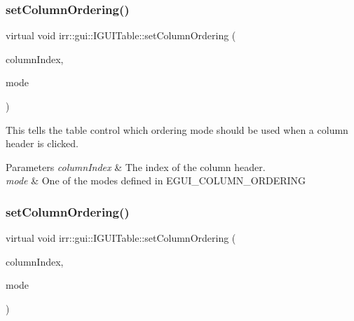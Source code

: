 \subsubsection{\texorpdfstring{set\+Column\+Ordering()}{setColumnOrdering()}\hspace{0.1cm}{\footnotesize\ttfamily [1/2]}}
{\footnotesize\ttfamily virtual void irr\+::gui\+::\+I\+G\+U\+I\+Table\+::set\+Column\+Ordering (\begin{DoxyParamCaption}\item[{\hyperlink{namespaceirr_a0416a53257075833e7002efd0a18e804}{u32}}]{column\+Index,  }\item[{\hyperlink{namespaceirr_1_1gui_a551e22458ae01a7eeaf87c0fbaaabf9a}{E\+G\+U\+I\+\_\+\+C\+O\+L\+U\+M\+N\+\_\+\+O\+R\+D\+E\+R\+I\+NG}}]{mode }\end{DoxyParamCaption})\hspace{0.3cm}{\ttfamily [pure virtual]}}



This tells the table control which ordering mode should be used when a column header is clicked. 


\begin{DoxyParams}{Parameters}
{\em column\+Index} & The index of the column header. \\
\hline
{\em mode} & One of the modes defined in E\+G\+U\+I\+\_\+\+C\+O\+L\+U\+M\+N\+\_\+\+O\+R\+D\+E\+R\+I\+NG \\
\hline
\end{DoxyParams}
\mbox{\label{classirr_1_1gui_1_1IGUITable_a7d0ce2de316fb7f0e6164e8c196a819e}} 
\subsubsection{\texorpdfstring{set\+Column\+Ordering()}{setColumnOrdering()}\hspace{0.1cm}{\footnotesize\ttfamily [2/2]}}
{\footnotesize\ttfamily virtual void irr\+::gui\+::\+I\+G\+U\+I\+Table\+::set\+Column\+Ordering (\begin{DoxyParamCaption}\item[{\hyperlink{namespaceirr_a0416a53257075833e7002efd0a18e804}{u32}}]{column\+Index,  }\item[{\hyperlink{namespaceirr_1_1gui_a551e22458ae01a7eeaf87c0fbaaabf9a}{E\+G\+U\+I\+\_\+\+C\+O\+L\+U\+M\+N\+\_\+\+O\+R\+D\+E\+R\+I\+NG}}]{mode }\end{DoxyParamCaption})\hspace{0.3cm}{\ttfamily [pure virtual]}}



